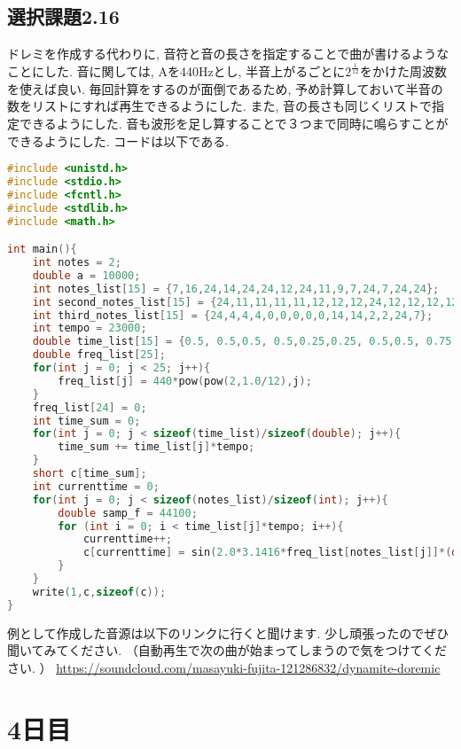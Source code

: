 \documentclass{ltjsarticle}
\begin{document}
\subsection{選択課題2.16}
ドレミを作成する代わりに, 音符と音の長さを指定することで曲が書けるようなことにした. 音に関しては, Aを440Hzとし, 半音上がるごとに$2^\frac{1}{12}$をかけた周波数を使えば良い. 毎回計算をするのが面倒であるため, 予め計算しておいて半音の数をリストにすれば再生できるようにした. また, 音の長さも同じくリストで指定できるようにした. 音も波形を足し算することで３つまで同時に鳴らすことができるようにした. コードは以下である. 
\begin{lstlisting}[caption=doremi.c,language=C]
#include <unistd.h>
#include <stdio.h>
#include <fcntl.h>
#include <stdlib.h>
#include <math.h>

int main(){
    int notes = 2;
    double a = 10000;
    int notes_list[15] = {7,16,24,14,24,24,12,24,11,9,7,24,7,24,24};
    int second_notes_list[15] = {24,11,11,11,11,12,12,12,24,12,12,12,12,24,11};
    int third_notes_list[15] = {24,4,4,4,0,0,0,0,0,14,14,2,2,24,7};
    int tempo = 23000;
    double time_list[15] = {0.5, 0.5,0.5, 0.5,0.25,0.25, 0.5,0.5, 0.75,0.5,0.23,0.02,0.5,0.5,1};
    double freq_list[25];
    for(int j = 0; j < 25; j++){
        freq_list[j] = 440*pow(pow(2,1.0/12),j);
    }
    freq_list[24] = 0;
    int time_sum = 0;
    for(int j = 0; j < sizeof(time_list)/sizeof(double); j++){
        time_sum += time_list[j]*tempo;
    }
    short c[time_sum];
    int currenttime = 0;
    for(int j = 0; j < sizeof(notes_list)/sizeof(int); j++){
        double samp_f = 44100;
        for (int i = 0; i < time_list[j]*tempo; i++){
            currenttime++;
            c[currenttime] = sin(2.0*3.1416*freq_list[notes_list[j]]*(double)i/samp_f) * a +  sin(2.0*3.1416*freq_list[second_notes_list[j]]*(double)i/2/samp_f) * a/1.8 +  sin(2.0*3.1416*freq_list[third_notes_list[j]]*(double)i/4/samp_f) * a;
        }
    }
    write(1,c,sizeof(c));
}
\end{lstlisting}
例として作成した音源は以下のリンクに行くと聞けます. 少し頑張ったのでぜひ聞いてみてください. （自動再生で次の曲が始まってしまうので気をつけてください. ）
\url{https://soundcloud.com/masayuki-fujita-121286832/dynamite-doremic}

\section{4日目}
\end{document}

